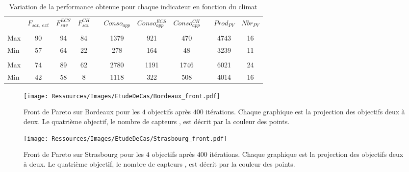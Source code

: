 \begin{table}
\centering
\caption[Performance maximale pouvant être obtenue pour différents indicateurs]
         {Variation de la performance obtenue pour chaque indicateur en fonction du climat}
\label{tab:bornes_front_pareto}
\begin{tabular}{L{2cm} c c c c c c c c c c}
    \toprule
                & $F_{sav,\,ext}$ & $F_{sav}^{ECS}$ & $F_{sav}^{CH}$ & & $Conso_{app}$ & $Conso_{app}^{ECS}$ & $Conso_{app}^{CH}$ & & $Prod_{PV}$ & $Nbr_{PV}$ \\
    \addlinespace
     \\
    \midrule
    Max & 90  & 94  & 84  &   & 1379  & 921 & 470 &   & 4743  & 16  \\
    Min & 57  & 64  & 22  &   & 278 & 164 & 48  &   & 3239  & 11  \\
    \addlinespace
     \\
    \midrule
    Max & 74  & 89  & 62  &   & 2780  & 1191  & 1746  &   & 6021  &  24 \\
    Min & 42  & 58  & 8 &   & 1118  & 322 & 508 &   & 4014  & 16  \\
    \bottomrule
\end{tabular}
\end{table}


\begin{figure}
    \centering
    \texttt{[image: Ressources/Images/EtudeDeCas/Bordeaux\_front.pdf]}
    \caption[Front de Pareto sur Bordeaux pour les $4$ objectifs après $400$ itérations]
             {Front de Pareto sur Bordeaux pour les $4$ objectifs après $400$ itérations.
              Chaque graphique est la projection des objectifs deux à deux.
              Le quatrième objectif, le nombre de capteurs , est décrit par la couleur des points.}
    \label{fig:front_pareto_bordeaux}
\end{figure}

\begin{figure}
    \centering
    \texttt{[image: Ressources/Images/EtudeDeCas/Strasbourg\_front.pdf]}
    \caption[Front de Pareto sur Strasbourg pour les $4$ objectifs après $400$ itérations]
             {Front de Pareto sur Strasbourg pour les $4$ objectifs après $400$ itérations.
              Chaque graphique est la projection des objectifs deux à deux.
              Le quatrième objectif, le nombre de capteurs , est décrit par la couleur des points.}
    \label{fig:front_pareto_strasbourg}
\end{figure}

